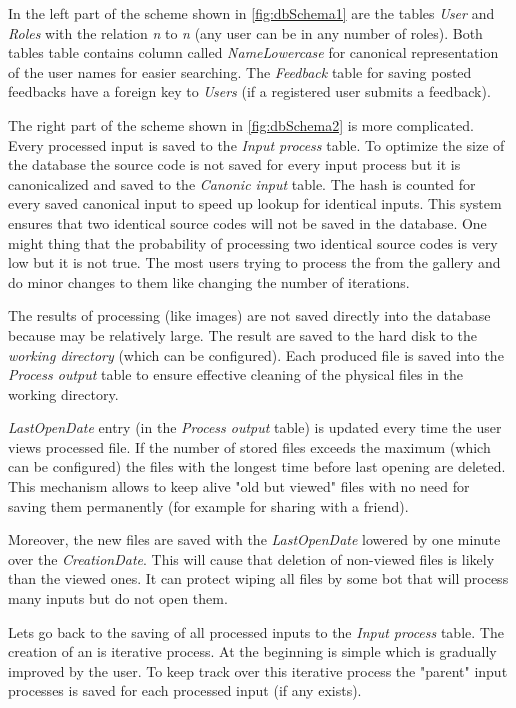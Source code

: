 In the left part of the scheme shown in \autoref{fig:dbSchema1} are the tables \emph{User} and \emph{Roles} with the relation \emph{n} to \emph{n} (any user can be in any number of roles).
Both tables table contains column called \emph{NameLowercase} for canonical representation of the user names for easier searching.
The \emph{Feedback} table for saving posted feedbacks have a foreign key to \emph{Users} (if a registered user submits a feedback).

The right part of the scheme shown in \autoref{fig:dbSchema2} is more complicated.
Every processed input is saved to the \emph{Input process} table.
To optimize the size of the database the source code is not saved for every input process but it is canonicalized and saved to the \emph{Canonic input} table.
The hash is counted for every saved canonical input to speed up lookup for identical inputs.
This system ensures that two identical source codes will not be saved in the database.
One might thing that the probability of processing two identical source codes is very low but it is not true.
The most users trying to process the \lsystems from  the gallery and do minor changes to them like changing the number of iterations.

The results of processing (like images) are not saved directly into the database because may be relatively large.
The result are saved to the hard disk to the \emph{working directory} (which can be configured).
Each produced file is saved into the \emph{Process output} table to ensure effective cleaning of the physical files in the working directory.

\emph{LastOpenDate} entry (in the \emph{Process output} table) is updated every time the user views processed file.
If the number of stored files exceeds the maximum (which can be configured) the files with the longest time before last opening are deleted.
This mechanism allows to keep alive "old but viewed" files with no need for saving them permanently (for example for sharing with a friend).

Moreover, the new files are saved with the \emph{LastOpenDate} lowered by one minute over the \emph{CreationDate}.
This will cause that deletion of non-viewed files is likely than the viewed ones.
It can protect wiping all files by some bot that will process many inputs but do not open them.

Lets go back to the saving of all processed inputs to the \emph{Input process} table.
The creation of an \lsystem is iterative process.
At the beginning is simple \lsystem which is gradually improved by the user.
To keep track over this iterative process the "parent" input processes is saved for each processed input (if any exists).

